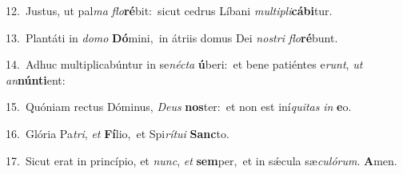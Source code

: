 {\numbfont\textcolor{\numbcolor}{12.}}~Justus, ut pal\textit{ma} \textit{flo}\-\textbf{ré}bit:~\star sicut cedrus Líbani \textit{mul}\-\textit{ti}\textit{pli}\textbf{cá}\textbf{bi}tur.\par
{\numbfont\textcolor{\numbcolor}{13.}}~Plantáti in \textit{do}\-\textit{mo} \textbf{Dó}\-mini,~\star in átriis domus Dei \textit{nos}\-\textit{tri} \textit{flo}\-\textbf{ré}bunt.\par
{\numbfont\textcolor{\numbcolor}{14.}}~Adhuc multiplicabúntur in se\-\textit{néc}\-\textit{ta} \textbf{ú}\-beri:~\star et bene patiéntes e\-\textit{runt}\-, \textit{ut} \textit{an}\-\textbf{nún}\textbf{ti}ent:\par
{\numbfont\textcolor{\numbcolor}{15.}}~Quóniam rectus Dóminus, \textit{De}\-\textit{us} \textbf{nos}\-ter:~\star et non est iní\-\textit{qui}\-\textit{tas} \textit{in} \textbf{e}\-o.\par
{\numbfont\textcolor{\numbcolor}{16.}}~Glória Pa\-\textit{tri}\-, \textit{et} \textbf{Fí}\-lio,~\star et Spi\-\textit{rí}\-\textit{tu}\textit{i} \textbf{Sanc}\-to.\par
{\numbfont\textcolor{\numbcolor}{17.}}~Sicut erat in princípio, et \textit{nunc}\-, \textit{et} \textbf{sem}\-per,~\star et in sǽcula sæ\-\textit{cu}\-\textit{ló}\textit{rum}. \textbf{A}\-men.\par
